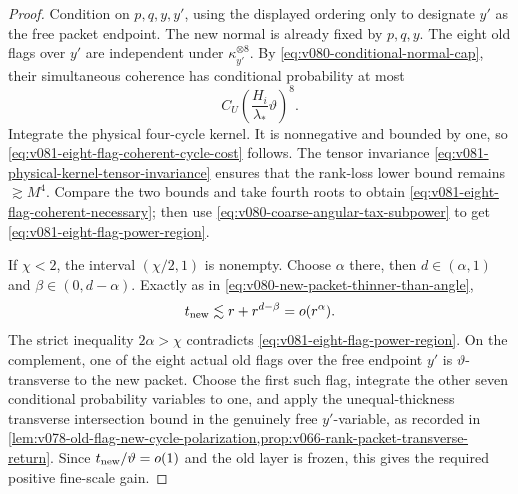 \documentclass[10pt]{article}
\begin{document}
\begin{proof}
Condition on \(p,q,y,y'\), using the displayed ordering only to designate \(y'\) as the free
packet endpoint.  The new normal is already fixed by \(p,q,y\).  The eight old flags over \(y'\)
are independent under \(\kappa_{y'}^{\otimes8}\).  By
\eqref{eq:v080-conditional-normal-cap}, their simultaneous coherence has conditional probability
at most
\[
C_U
\left(\frac{H_i}{\lambda_*}\vartheta\right)^8.
\]
Integrate the physical four-cycle kernel.  It is nonnegative and bounded by one, so
\eqref{eq:v081-eight-flag-coherent-cycle-cost} follows.  The tensor invariance
\eqref{eq:v081-physical-kernel-tensor-invariance} ensures that the rank-loss lower bound remains
\(\gtrsim M^4\).  Compare the two bounds and take fourth roots to obtain
\eqref{eq:v081-eight-flag-coherent-necessary}; then use
\eqref{eq:v080-coarse-angular-tax-subpower} to get
\eqref{eq:v081-eight-flag-power-region}.

If \(\chi<2\), the interval \((\chi/2,1)\) is nonempty.  Choose
\(\alpha\) there, then \(d\in(\alpha,1)\) and
\(\beta\in(0,d-\alpha)\).  Exactly as in
\eqref{eq:v080-new-packet-thinner-than-angle},
\[
t_{\rm new}
\lesssim
r+r^{d-\beta}
=
o(r^\alpha).
\]
The strict inequality \(2\alpha>\chi\) contradicts
\eqref{eq:v081-eight-flag-power-region}.  On the complement, one of the eight actual old flags
over the free endpoint \(y'\) is \(\vartheta\)-transverse to the new packet.  Choose the first such
flag, integrate the other seven conditional probability variables to one, and apply the
unequal-thickness transverse intersection bound in the genuinely free \(y'\)-variable, as recorded in
\cref{lem:v078-old-flag-new-cycle-polarization,prop:v066-rank-packet-transverse-return}.  Since
\(t_{\rm new}/\vartheta=o(1)\) and the old layer is frozen, this gives the required positive
fine-scale gain.
\end{proof}
\end{document}
